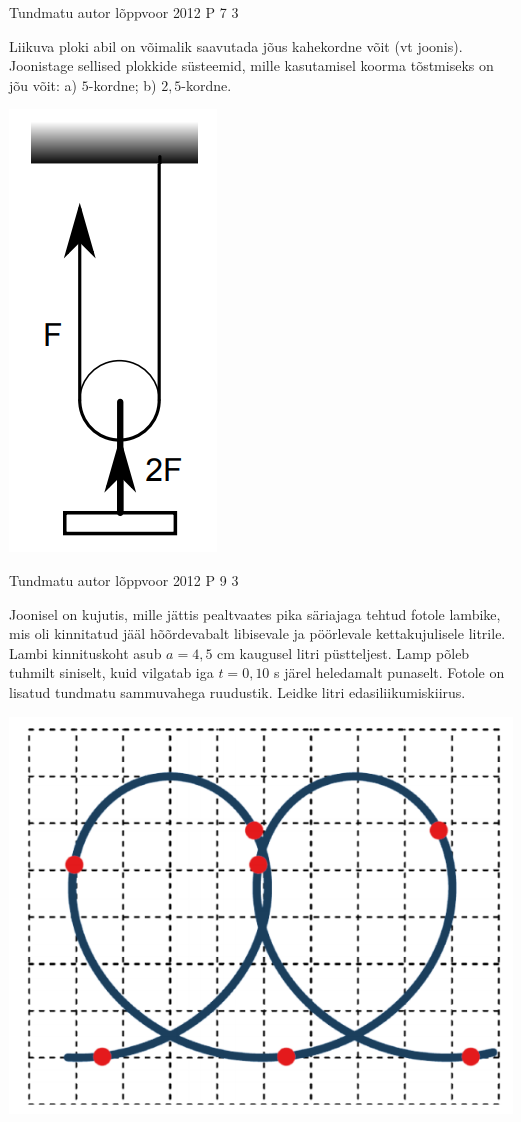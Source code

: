 \documentclass[11pt]{article}
\begin{document}
{%
{Tundmatu autor} %
{lõppvoor} %
{2012} %
{P 7} %
{3} %
{
\ifStatement
Liikuva ploki abil on võimalik saavutada jõus kahekordne võit (vt joonis). Joonistage sellised plokkide süsteemid, mille kasutamisel koorma tõstmiseks on jõu võit: a) $5$-kordne; b) $2,5$-kordne.
\begin{center}
	\includegraphics[width=0.5\linewidth]{2012-v3p-07-yl.PNG}
\end{center}
\fi
}

{Tundmatu autor} %
{lõppvoor} %
{2012} %
{P 9} %
{3} %
{
\ifStatement
Joonisel on kujutis, mille jättis pealtvaates pika säriajaga tehtud fotole lambike, mis oli kinnitatud jääl hõõrdevabalt libisevale ja pöörlevale kettakujulisele litrile. Lambi kinnituskoht asub $a = 4,5$ cm kaugusel litri püstteljest. Lamp põleb tuhmilt siniselt, kuid vilgatab  iga $t = 0,10$ s järel heledamalt punaselt. Fotole on lisatud tundmatu sammuvahega ruudustik. Leidke litri edasiliikumiskiirus.
\begin{center}
	\includegraphics[width=0.5\linewidth]{2012-v3p-09-yl.PNG}
\end{center}
\fi
}


}
\end{document}
